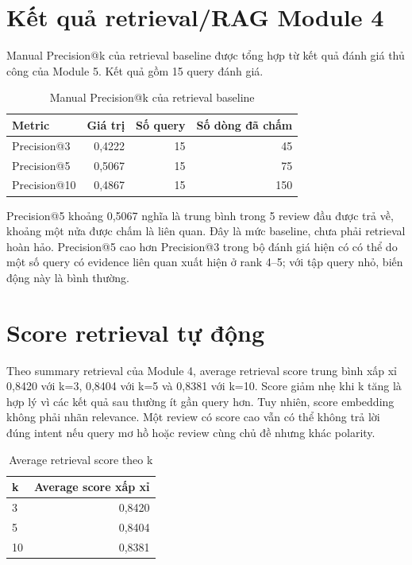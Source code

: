 \section{Kết quả retrieval/RAG Module 4}
Manual Precision@k của retrieval baseline được tổng hợp từ kết quả đánh giá thủ công của Module 5. Kết quả gồm 15 query đánh giá.
\begin{table}[H]\centering\caption{Manual Precision@k của retrieval baseline}\label{tab:manual-precision}\begin{tabular}{lrrr}\toprule Metric & Giá trị & Số query & Số dòng đã chấm \\\midrule Precision@3 & 0,4222 & 15 & 45 \\ Precision@5 & 0,5067 & 15 & 75 \\ Precision@10 & 0,4867 & 15 & 150 \\\bottomrule\end{tabular}\end{table}

Precision@5 khoảng 0,5067 nghĩa là trung bình trong 5 review đầu được trả về, khoảng một nửa được chấm là liên quan. Đây là mức baseline, chưa phải retrieval hoàn hảo. Precision@5 cao hơn Precision@3 trong bộ đánh giá hiện có có thể do một số query có evidence liên quan xuất hiện ở rank 4--5; với tập query nhỏ, biến động này là bình thường.


\section{Score retrieval tự động}
Theo summary retrieval của Module 4, average retrieval score trung bình xấp xỉ 0,8420 với k=3, 0,8404 với k=5 và 0,8381 với k=10. Score giảm nhẹ khi k tăng là hợp lý vì các kết quả sau thường ít gần query hơn. Tuy nhiên, score embedding không phải nhãn relevance. Một review có score cao vẫn có thể không trả lời đúng intent nếu query mơ hồ hoặc review cùng chủ đề nhưng khác polarity.
\begin{table}[H]\centering\caption{Average retrieval score theo k}\label{tab:retrieval-score}\begin{tabular}{lr}\toprule k & Average score xấp xỉ \\\midrule 3 & 0,8420 \\ 5 & 0,8404 \\ 10 & 0,8381 \\\bottomrule\end{tabular}\end{table}


